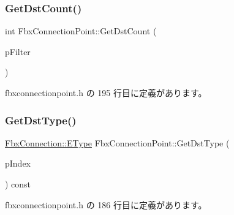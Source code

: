 \subsubsection{\texorpdfstring{Get\+Dst\+Count()}{GetDstCount()}\hspace{0.1cm}{\footnotesize\ttfamily [2/2]}}
{\footnotesize\ttfamily int Fbx\+Connection\+Point\+::\+Get\+Dst\+Count (\begin{DoxyParamCaption}\item[{\hyperlink{class_fbx_connection_point_filter}{Fbx\+Connection\+Point\+Filter} $\ast$}]{p\+Filter }\end{DoxyParamCaption})\hspace{0.3cm}{\ttfamily [inline]}}



 fbxconnectionpoint.\+h の 195 行目に定義があります。

\mbox{\label{class_fbx_connection_point_af328bd58235b6255226320b9d69a606f}} 
\subsubsection{\texorpdfstring{Get\+Dst\+Type()}{GetDstType()}\hspace{0.1cm}{\footnotesize\ttfamily [1/2]}}
{\footnotesize\ttfamily \hyperlink{class_fbx_connection_a3df448a5db356652ab99fd2be2553749}{Fbx\+Connection\+::\+E\+Type} Fbx\+Connection\+Point\+::\+Get\+Dst\+Type (\begin{DoxyParamCaption}\item[{int}]{p\+Index }\end{DoxyParamCaption}) const\hspace{0.3cm}{\ttfamily [inline]}}



 fbxconnectionpoint.\+h の 186 行目に定義があります。

\mbox{\label{class_fbx_connection_point_a5319469d7eaadf57f569a91218620ba9}} 
